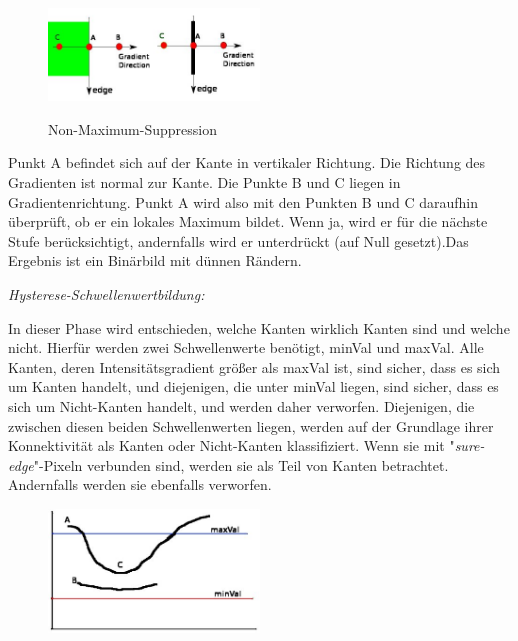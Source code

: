 \begin{compactenum}
\begin{compactenum}
        \begin{figure}[H]
            \centering
            \includegraphics[width=0.5\textwidth]{pics/nms.jpg}
            \caption{Non-Maximum-Suppression}
            \cite{NMSPic}
            \label{fig:anpr:edge:nms}
            \end{figure}
            Punkt A befindet sich auf der Kante in vertikaler Richtung. Die Richtung des Gradienten ist normal zur Kante. Die Punkte B und C liegen in Gradientenrichtung. Punkt A wird also mit den Punkten B und C daraufhin überprüft, ob er ein lokales Maximum bildet. Wenn ja, wird er für die nächste Stufe berücksichtigt, andernfalls wird er unterdrückt (auf Null gesetzt).Das Ergebnis ist ein Binärbild mit dünnen Rändern.
    \end{compactenum}
    \item \textit{Hysterese-Schwellenwertbildung: }
    \begin{compactenum}
        \item  In dieser Phase wird entschieden, welche Kanten wirklich Kanten sind und welche nicht. Hierfür werden zwei Schwellenwerte benötigt, minVal und maxVal. Alle Kanten, deren Intensitätsgradient größer als maxVal ist, sind sicher, dass es sich um Kanten handelt, und diejenigen, die unter minVal liegen, sind sicher, dass es sich um Nicht-Kanten handelt, und werden daher verworfen. Diejenigen, die zwischen diesen beiden Schwellenwerten liegen, werden auf der Grundlage ihrer Konnektivität als Kanten oder Nicht-Kanten klassifiziert. Wenn sie mit "\textit{sure-edge}"-Pixeln verbunden sind, werden sie als Teil von Kanten betrachtet. Andernfalls werden sie ebenfalls verworfen.
        \begin{figure}[H]
            \centering
            \includegraphics[width=0.5\textwidth]{pics/hysteresis.jpg}

\end{figure}
\end{compactenum}
\end{compactenum}
